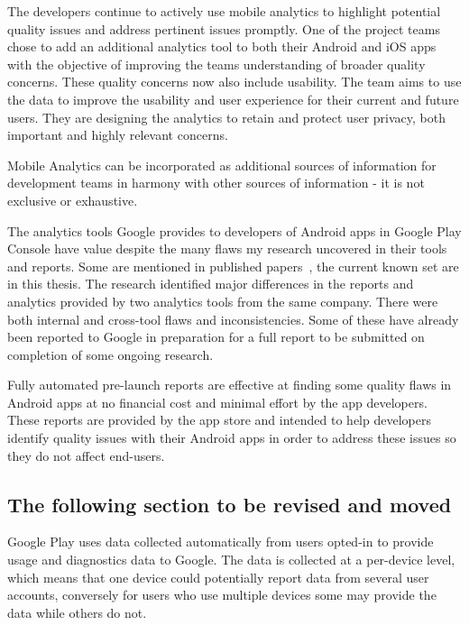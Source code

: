 The developers continue to actively use mobile analytics to highlight potential quality issues and address pertinent issues promptly. One of the project teams chose to add an additional analytics tool to both their Android and iOS apps with the objective of improving the teams understanding of broader quality concerns. These quality concerns now also include usability. The team aims to use the data to improve the usability and user experience for their current and future users. They are designing the analytics to retain and protect user privacy, both important and highly relevant concerns.

Mobile Analytics can be incorporated as additional sources of information for development teams in harmony with other sources of information - it is not exclusive or exhaustive.

The analytics tools Google provides to developers of Android apps in Google Play Console have value despite the many flaws my research uncovered in their tools and reports. Some are mentioned in published papers~\cite{harty_google_play_console_insightful_development_using_android_vitals_and_pre_launch_reports, harty_better_android_apps_using_android_vitals, harty_improving_app_quality_despite_flawed_mobile_analytics}, the current known set are in this thesis. The research identified major differences in the reports and analytics provided by two analytics tools from the same company. There were both internal and cross-tool flaws and inconsistencies. Some of these have already been reported to Google in preparation for a full report to be submitted on completion of some ongoing research.

Fully automated pre-launch reports are effective at finding some quality flaws in Android apps at no financial cost and minimal effort by the app developers. These reports are provided by the app store and intended to help developers identify quality issues with their Android apps in order to address these issues so they do not affect end-users.

\subsection{The following section to be revised and moved}

 

Google Play uses data collected automatically from users opted-in to provide usage and diagnostics data to Google. The data is collected at a per-device level, which means that one device could potentially report data from several user accounts, conversely for users who use multiple devices some may provide the data while others do not.


